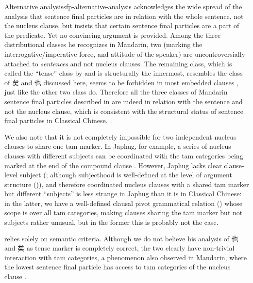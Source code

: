 \documentclass[UTF8, a4paper, oneside, scheme=plain, 12pt]{ctexrep}
\newcommand*{\citesec}[1]{\S~{#1}}
\newcommand*{\citepage}[1]{p.~{#1}}
\newcommand*{\citepages}[1]{pp.~{#1}}
\begin{document}
\begin{infobox}{Alternative analysis}{sfp-alternative-analysis}
    \citet[\citepage{233}]{zhudexigrammar} acknowledges the wide spread of the analysis that sentence final particles are in relation with the whole sentence, not the nucleus clause,
    but insists that certain sentence final particles are a part of the predicate.
    Yet no convincing argument is provided.
    Among the three distributional classes he recognizes in Mandarin,
    two (marking the interrogative/imperative force, and attitude of the speaker)
    are uncontroversially attached to \emph{sentences} and not nucleus clauses.
    The remaining class, which is called the ``tense'' class by \citet{zhudexigrammar}
    and is structurally the innermost,
    resembles the class of 矣 and 也 discussed here,
    seems to be forbidden in most embedded clauses \citep{deng2010},
    just like the other two class do.
    Therefore all the three classes of Mandarin sentence final particles described in \citet{zhudexigrammar}
    are indeed in relation with the sentence and not the nucleus clause,
    which is consistent with the structural status of sentence final particles in Classical Chinese.
    
    We also note that it is not completely impossible for two independent nucleus clauses to share one \ac{tam} marker.
    In Japhug, for example, a series of nucleus clauses with different subjects can be coordinated with the \ac{tam} categories being marked at the end of the compound clause \citep[\citepages{1090-1091}]{jacques2021grammar}.
    However, Japhug lacks clear clause-level subject
    (\citealt[\citesec{2.5.3}]{jacques2021grammar}; although subjecthood is well-defined at the level of argument structure ()),
    and therefore coordinated nucleus clauses with a shared \ac{tam} marker but different ``subjects'' is less strange in Japhug than it is in Classical Chinese:
    in the latter, we have a well-defined clausal pivot grammatical relation () whose scope is over all \ac{tam} categories,
    making clauses sharing the \ac{tam} marker but not subjects rather unusual,
    but in the former this is probably not the case.

    \citet[\citepages{443-445}]{meiguang2018} relies solely on semantic criteria.
    Although we do not believe his analysis of 也 and 矣 as tense marker is completely correct,
    the two clearly have non-trivial interaction with \ac{tam} categories,
    a phenomenon also observed in Mandarin,
    where the lowest sentence final particle has access to \ac{tam} categories of the nucleus clause \citep[\citepage{258}]{paul2014new}.
\end{infobox}
\end{document}
